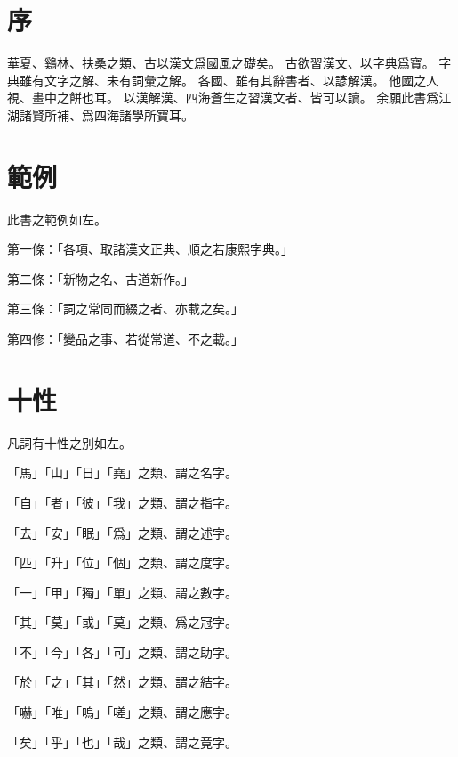\section{序}
華夏、鷄林、扶桑之類、古以漢文爲國風之礎矣。
古欲習漢文、以字典爲寶。
字典雖有文字之解、未有詞彙之解。
各國、雖有其辭書者、以諺解漢。
他國之人視、畫中之餅也耳。
以漢解漢、四海蒼生之習漢文者、皆可以讀。
余願此書爲江湖諸賢所補、爲四海諸學所寶耳。
\section{範例}
此書之範例如左。
\par 第一條：「各項、取諸漢文正典、順之若康熙字典。」
\par 第二條：「新物之名、古道新作。」
\par 第三條：「詞之常同而綴之者、亦載之矣。」
\par 第四修：「變品之事、若從常道、不之載。」
\section{十性}
\par 凡詞有十性之別如左。
\par 「馬」「山」「日」「堯」之類、謂之名字。
\par 「自」「者」「彼」「我」之類、謂之指字。
\par 「去」「安」「眠」「爲」之類、謂之述字。
\par 「匹」「升」「位」「個」之類、謂之度字。
\par 「一」「甲」「獨」「單」之類、謂之數字。
\par 「其」「莫」「或」「莫」之類、爲之冠字。
\par 「不」「今」「各」「可」之類、謂之助字。
\par 「於」「之」「其」「然」之類、謂之結字。
\par 「嚇」「唯」「嗚」「嗟」之類、謂之應字。
\par 「矣」「乎」「也」「哉」之類、謂之竟字。
